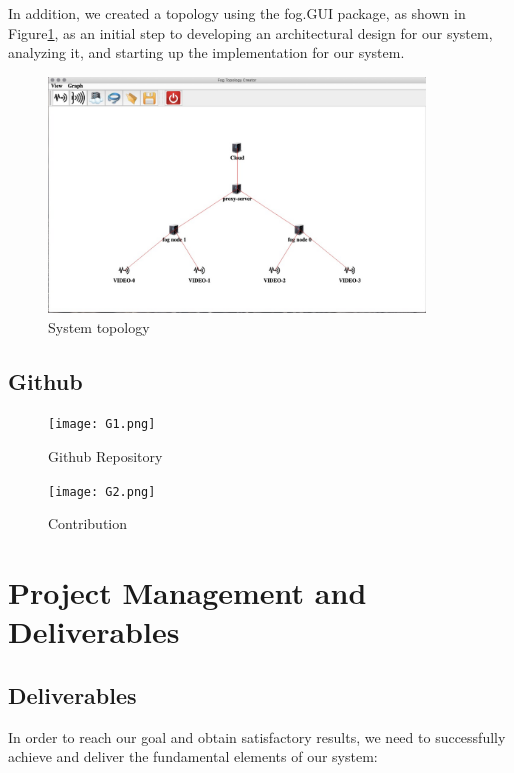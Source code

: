 \documentclass[12pt]{article}
\begin{document}
\newpage
In addition, we created a topology using the fog.GUI package, as shown in Figure\ref{fig:2}, as an initial step to developing an architectural design for our system, analyzing it, and starting up the implementation for our system.

\begin{figure}[h]
    \centering
    \includegraphics[width=10cm]{WhatsApp Image 2020-10-24 at 4.40.16 PM.jpeg}
    \caption{System topology }
    \label{fig:2}
\end{figure}

\subsection{Github}
\begin{figure}[h]
    \centering
    \texttt{[image: G1.png]}
    \caption{Github Repository}
    \label{Repo}
\end{figure}

\begin{figure}[h]
    \centering
    \texttt{[image: G2.png]}
    \caption{Contribution }
    \label{Contrib}
\end{figure}

\newpage


\section{Project Management and Deliverables}
\subsection{Deliverables}
In order to reach our goal and obtain satisfactory results, we need to successfully achieve and deliver the fundamental elements of our system:
\end{document}
